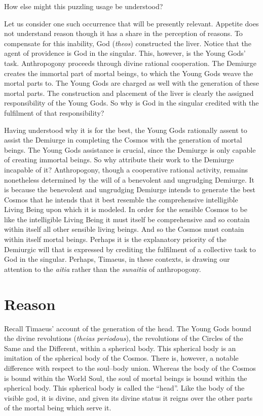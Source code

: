 How else might this puzzling usage be understood?

Let us consider one such occurrence that will be presently relevant. Appetite does not understand reason though it has a share in the perception of reasons. To compensate for this inability, God (\emph{theos}) constructed the liver. Notice that the agent of providence is God in the singular. This, however, is the Young Gods' task. Anthropogony proceeds through divine rational cooperation. The Demiurge creates the immortal part of mortal beings, to which the Young Gods weave the mortal parts to. The Young Gods are charged as well with the generation of these mortal parts. The construction and placement of the liver is clearly the assigned responsibility of the Young Gods. So why is God in the singular credited with the fulfilment of that responsibility? 

Having understood why it is for the best, the Young Gods rationally assent to assist the Demiurge in completing the Cosmos with the generation of mortal beings. The Young Gods assistance is crucial, since the Demiurge is only capable of creating immortal beings. So why attribute their work to the Demiurge incapable of it? Anthropogony, though a cooperative rational activity, remains nonetheless determined by the will of a benevolent and ungrudging Demiurge. It is because the benevolent and ungrudging Demiurge intends to generate the best Cosmos that he intends that it best resemble the comprehensive intelligible Living Being upon which it is modeled. In order for the sensible Cosmos to be like the intelligible Living Being it must itself be comprehensive and so contain within itself all other sensible living beings. And so the Cosmos must contain within itself mortal beings. Perhaps it is the explanatory priority of the Demiurgic will that is expressed by crediting the fulfilment of a collective task to God in the singular. Perhaps, Timaeus, in these contexts, is drawing our attention to the \emph{aitia} rather than the \emph{sunaitia} of anthropogony.



\section{Reason} %
\label{sec:reason}

Recall Timaeus' account of the generation of the head. The Young Gods bound the divine revolutions (\emph{theias periodous}), the revolutions of the Circles of the Same and the Different, within a spherical body. This spherical body is an imitation of the spherical body of the Cosmos. There is, however, a notable difference with respect to the soul–body union. Whereas the body of the Cosmos is bound within the World Soul, the soul of mortal beings is bound within the spherical body. This spherical body is called the “head”. Like the body of the visible god, it is divine, and given its divine status it reigns over the other parts of the mortal being which serve it.

